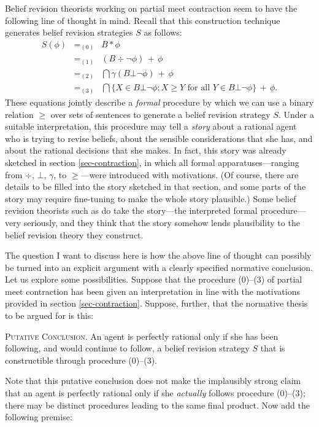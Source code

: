 Belief revision theorists working on partial meet contraction seem to have the following line of thought in mind. Recall that this construction technique generates belief revision strategies $S$ as follows: 
	\begin{eqnarray*}
	S(\phi) &=_{(0)}& B * \phi \\
			&=_{(1)}& (B \div  \neg\phi) \,+\, \phi \\
			&=_{(2)}& \bigcap \gamma(B \bot \neg\phi) \,+\, \phi \\
			&=_{(3)}& \bigcap \{ X \in B\bot\neg\phi : X \ge Y \mbox{ for all } Y \in B\bot\neg\phi \} \,+\, \phi.
	\end{eqnarray*}
These equations jointly describe a {\em formal} procedure by which we can use a binary relation $\ge$ over sets of sentences to generate a belief revision strategy $S$. Under a suitable interpretation, this procedure may tell a {\em story} about a rational agent who is trying to revise beliefs, about the sensible considerations that she has, and about the rational decisions that she makes. In fact, this story was already sketched in section \ref{sec-contraction}, in which all formal apparatuses---ranging from $\div$, $\bot$, $\gamma$, to $\ge$---were introduced with motivations. (Of course, there are details to be filled into the story sketched in that section, and some parts of the story may require fine-tuning to make the whole story plausible.) Some belief revision theorists such as \citet{gardenfors1984epistemic} do take the story---the interpreted formal procedure---very seriously, and they think that the story somehow lends plausibility to the belief revision theory they construct. 

The question I want to discuss here is how the above line of thought can possibly be turned into an explicit argument with a clearly specified normative conclusion. Let us explore some possibilities. Suppose that the procedure ($0$)--($3$) of partial meet contraction has been given an interpretation in line with the motivations provided in section \ref{sec-contraction}. Suppose, further, that the normative thesis to be argued for is this: \op

	\xm \textsc{Putative Conclusion.} An agent is perfectly rational only if she has been following, and would continue to follow, a belief revision strategy $S$ that is constructible through procedure ($0$)--($3$).

\ed Note that this putative conclusion does not make the implausibly strong claim that an agent is perfectly rational only if she {\em actually} follows procedure ($0$)--($3$); there may be distinct procedures leading to the same final product. Now add the following premise: \op

